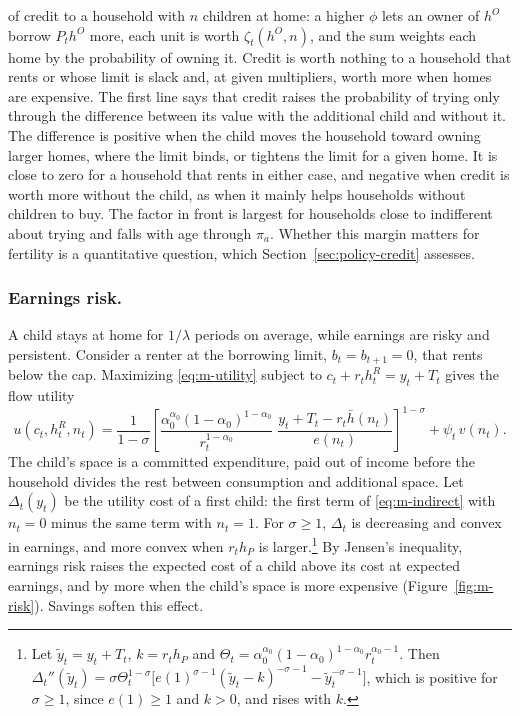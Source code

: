 of credit to a household with $n$ children at home: a higher $\phi$ lets an
owner of $h^O$ borrow $P_th^O$ more, each unit is worth $\zeta_t(h^O,n)$, and
the sum weights each home by the probability of owning it. Credit is worth
nothing to a household that rents or whose limit is slack and, at given
multipliers, worth more when homes are expensive. The first line says that
credit raises the probability of trying only through the difference between
its value with the additional child and without it. The difference is
positive when the child moves the household toward owning larger homes,
where the limit binds, or tightens the limit for a given home. It is close to
zero for a household that rents in either case, and negative when credit is
worth more without the child, as when it mainly helps households without
children to buy. The factor in front is largest for households close to
indifferent about trying and falls with age through $\pi_a$. Whether this
margin matters for fertility is a quantitative question, which
Section~\ref{sec:policy-credit} assesses.

\subsubsection*{Earnings risk.}
A child stays at home for $1/\lambda$ periods on average, while earnings are
risky and persistent. Consider a renter at the borrowing limit,
$b_t=b_{t+1}=0$, that rents below the cap. Maximizing \eqref{eq:m-utility}
subject to $c_t+r_th^R_t=y_t+T_t$ gives the flow utility
\begin{equation}
 u(c_t,h^R_t,n_t)=\frac{1}{1-\sigma}\left[\frac{\alpha_0^{\alpha_0}(1-\alpha_0)^{1-\alpha_0}}{r_t^{1-\alpha_0}}\;
 \frac{y_t+T_t-r_t\bar h(n_t)}{e(n_t)}\right]^{1-\sigma}+\psi_t\,v(n_t).
 \label{eq:m-indirect}
\end{equation}
The child's space is a committed expenditure, paid out of income before the
household divides the rest between consumption and additional space. Let
$\Delta_t(y_t)$ be the utility cost of a first child: the first term of
\eqref{eq:m-indirect} with $n_t=0$ minus the same term with $n_t=1$. For
$\sigma\ge1$, $\Delta_t$ is decreasing and convex in earnings, and more convex
when $r_th_P$ is larger.\footnote{Let $\tilde y_t=y_t+T_t$, $k=r_th_P$ and
$\Theta_t=\alpha_0^{\alpha_0}(1-\alpha_0)^{1-\alpha_0}r_t^{\alpha_0-1}$. Then
$\Delta_t''(\tilde y_t)=\sigma\Theta_t^{1-\sigma}\bigl[e(1)^{\sigma-1}(\tilde y_t-k)^{-\sigma-1}-\tilde y_t^{-\sigma-1}\bigr]$,
which is positive for $\sigma\ge1$, since $e(1)\ge1$ and $k>0$, and rises
with $k$.} By Jensen's inequality, earnings risk raises the expected cost of a
child above its cost at expected earnings, and by more when the child's space
is more expensive (Figure~\ref{fig:m-risk}). Savings soften this effect.

